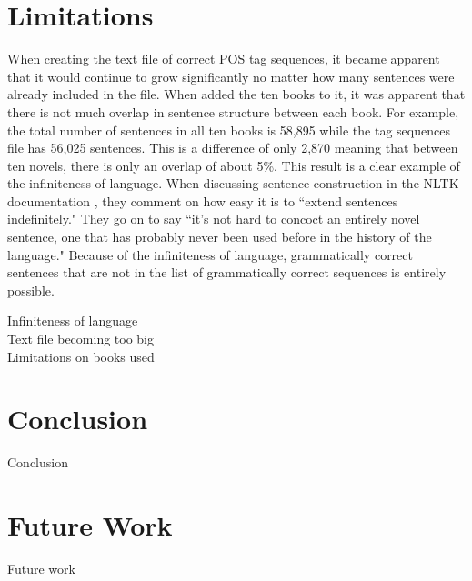 \documentclass[11pt,a4paper]{article}
\begin{document}
\begin{multicols}{2}
\section{Limitations}
When creating the text file of correct POS tag sequences, it became apparent that it would continue to grow significantly no matter how many sentences were already included in the file. When added the ten books to it, it was apparent that there is not much overlap in sentence structure between each book. For example, the total number of sentences in all ten books is 58,895 while the tag sequences file has 56,025 sentences. This is a difference of only 2,870 meaning that between ten novels, there is only an overlap of about 5\%. This result is a clear example of the infiniteness of language. When discussing sentence construction in the NLTK documentation \cite{nltk}, they comment on how easy it is to ``extend sentences indefinitely." They go on to say ``it's not hard to concoct an entirely novel sentence, one that has probably never been used before in the history of the language." Because of the infiniteness of language, grammatically correct sentences that are not in the list of grammatically correct sequences is entirely possible.



Infiniteness of language\\
Text file becoming too big\\
Limitations on books used\\

\section{Conclusion}
Conclusion

\section{Future Work}
Future work

\newpage




\end{multicols}
\end{document}
